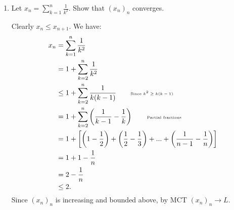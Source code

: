 \begin{enumerate}[label = (\arabic*)]
        \item Let $x_n = \sum_{k = 1}^n \frac{1}{k^2}$. Show that $(x_n)_n$ converges.
            {\color{red} \begin{solution}
                Clearly $x_n \leq x_{n+1}$. We have:
                    \begin{equation*}
                    \begin{split}
                        x_n 
                        & = \sum_{k=1}^n \frac{1}{k^2} \\
                        & = 1 + \sum_{k=2}^n \frac{1}{k^2} \\
                        & \leq 1 + \sum_{k=2}^n \frac{1}{k(k-1)} \quad\quad \text{\tiny Since $k^2 \geq k(k-1)$}\\
                        & = 1 + \sum_{k=2}^n \left(\frac{1}{k-1} - \frac{1}{k}\right) \quad\quad \text{\tiny Partial fractions} \\
                        & = 1 + \left[ \left(1 - \frac{1}{2}\right) + \left(\frac{1}{2} - \frac{1}{3}\right) + ... + \left(\frac{1}{n-1} - \frac{1}{n}\right)\right] \\
                        & = 1 + 1 - \frac{1}{n} \\
                        & = 2 - \frac{1}{n} \\
                        & \leq 2.
                    \end{split}
                    \end{equation*}
                Since $(x_n)_n$ is increasing and bounded above, by MCT $(x_n)_n \rightarrow L$.
            \end{solution}}
        

\end{enumerate}
